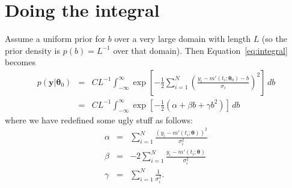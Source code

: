 \documentclass[a4paper, 11pt]{article}
\newcommand{\yy}{\boldsymbol{y}}	%
\newcommand{\btheta}{\boldsymbol{\theta}}  %
\begin{document}
\section{Doing the integral}
Assume a uniform prior for $b$ over a very large domain with length
$L$ (so the prior density is $p(b) = L^{-1}$ over that domain). Then
Equation~\ref{eq:integral} becomes
\begin{eqnarray}
p(\yy | \btheta_0) &=& CL^{-1}\int_{-\infty}^\infty
\exp\left[
-\frac{1}{2}\sum_{i=1}^N
\left(\frac{y_i - m'(t_i; \btheta_0) - b}{\sigma_i}
\right)^2
\right]
\, db \\
&=&
CL^{-1}\int_{-\infty}^\infty
\exp\left[
-\frac{1}{2}
\left(\alpha + \beta b + \gamma b^2\right)
\right]
\, db
\end{eqnarray}
where we have redefined some ugly stuff as follows:
\begin{eqnarray}
\alpha &=& \sum_{i=1}^N \frac{\left(y_i - m'(t_i; \btheta)\right)^2}{\sigma_i^2}\\
\beta  &=& -2\sum_{i=1}^N\frac{y_i - m'(t_i; \btheta)}{\sigma_i^2}\\
\gamma &=& \sum_{i=1}^N \frac{1}{\sigma_i^2}.
\end{eqnarray}
\end{document}

